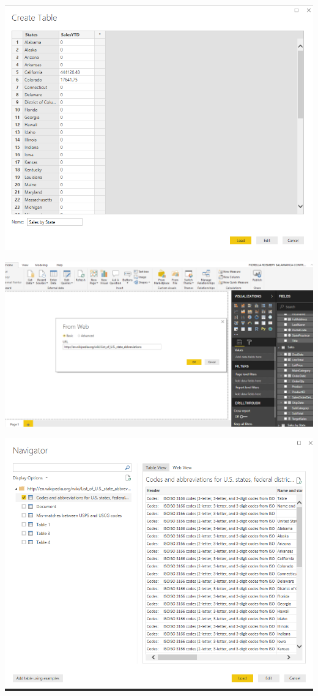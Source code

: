 	\begin{center}
	\includegraphics[width=15cm]{./Imagenes/EJER1T3(3)}
	\end{center}	

	\begin{center}
	\includegraphics[width=15cm]{./Imagenes/EJER1T3(4)}
	\end{center}	

	\begin{center}
	\includegraphics[width=15cm]{./Imagenes/EJER1T3(5)}
	\end{center}	

